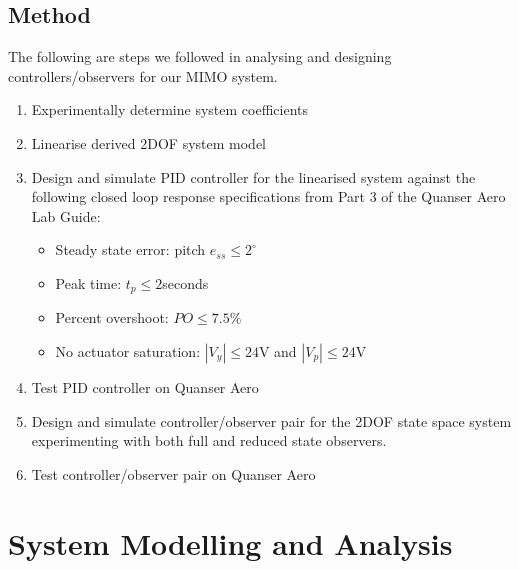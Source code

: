 \documentclass[11pt]{article}
\begin{document}
\subsection{Method}
The following are steps we followed in analysing and designing controllers/observers for our MIMO system.
\begin{enumerate}
    \item Experimentally determine system coefficients
    \item Linearise derived 2DOF system model
    \item Design and simulate PID controller for the linearised system against the following closed loop response specifications from Part 3 of the Quanser Aero Lab Guide:
    \begin{itemize}
        \item Steady state error: pitch $e_{ss} \leq 2^{\circ}$
        \item Peak time: $t_p \leq 2$seconds
        \item Percent overshoot: $PO \leq 7.5\%$
        \item No actuator saturation: $|V_y| \leq 24$V and $|V_p| \leq 24$V
    \end{itemize}
    \item Test PID controller on Quanser Aero
    \item Design and simulate controller/observer pair for the 2DOF state space system experimenting with both full and reduced state observers.
    \item Test controller/observer pair on Quanser Aero
\end{enumerate}

\section{System Modelling and Analysis}
\end{document}
